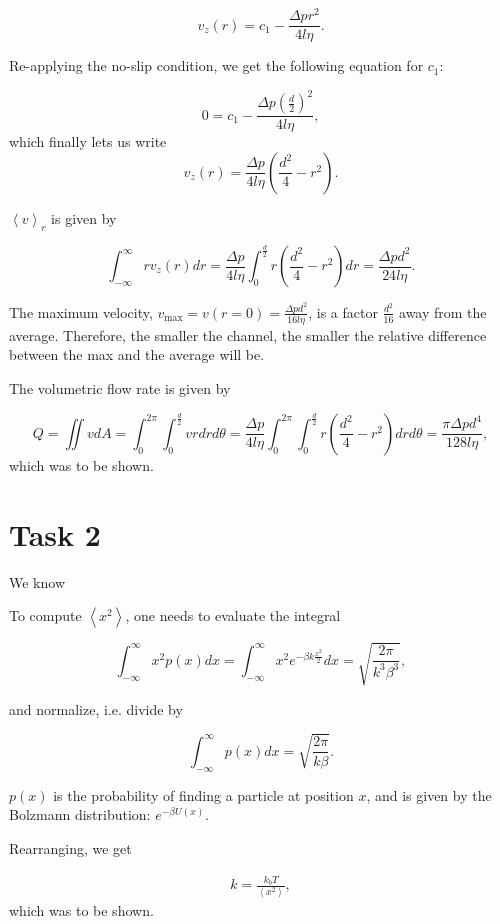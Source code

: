\begin{equation*}
    v_z(r) = c_1 - \frac{\Delta pr^2}{4l\eta}.
\end{equation*}

Re-applying the no-slip condition, we get the following equation for $c_1$:

\begin{equation*}
    0 = c_1 - \frac{\Delta p\left(\frac{d}{2}\right)^2}{4l\eta},
\end{equation*}
which finally lets us write
\begin{equation*}
    v_z(r) = \frac{\Delta p}{4l\eta}\left(\frac{d^2}{4} - r^2\right).
\end{equation*}

$\left<v\right>_r$ is given by

\begin{equation*}
    \int_{-\infty}^\infty rv_z(r)dr = \frac{\Delta p}{4l\eta}\int_0^\frac{d}{2} r\left(\frac{d^2}{4} - r^2\right)dr = \frac{\Delta p d^2}{24l\eta}.
\end{equation*}

The maximum velocity, $v_\text{max} = v(r = 0) = \frac{\Delta p d^2}{16l\eta}$, is a factor $\frac{d^2}{16}$ away from the average. 
Therefore, the smaller the channel, the smaller the relative difference between the max and the average will be.

The volumetric flow rate is given by

\begin{equation*}
    Q = \iint v dA = \int_0^{2\pi}\int_0^\frac{d}{2} v rdrd\theta 
    = \frac{\Delta p}{4l\eta}\int_0^{2\pi} \int_0^\frac{d}{2} r\left(\frac{d^2}{4} - r^2\right)drd\theta 
    = \frac{\pi\Delta p d^4}{128l\eta},
\end{equation*}
which was to be shown. 

\section*{Task 2}

We know

To compute $\left<x^2\right>$, one needs to evaluate the integral

\begin{equation*}
    \int_{-\infty}^\infty x^2 p(x) dx = \int_{-\infty}^\infty x^2 e^{-\beta k\frac{x^2}{2}} dx = \sqrt{\frac{2\pi}{k^3\beta^3}},
\end{equation*}

and normalize, i.e. divide by 

\begin{equation*}
    \int_{-\infty}^\infty p(x) dx = \sqrt{\frac{2\pi}{k\beta}}.
\end{equation*}

$p(x)$ is the probability of finding a particle at position $x$, and is given by the Bolzmann distribution: $e^{-\beta U(x)}$.

Rearranging, we get

\begin{eqnarray}
    k = \frac{k_bT}{\left<x^2\right>},
\end{eqnarray}
which was to be shown.
